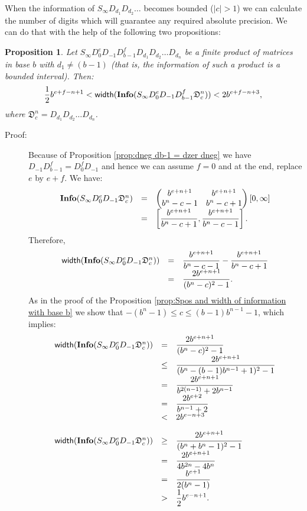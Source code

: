 \documentclass[11pt,a4paper]{article}
\newtheorem{prop}[tm]{Proposition}
\newenvironment{proof}
	{ \begin{description} \item[Proof:] \footnotesize }
	{ \end{description} }
\begin{document}
When the information of $S_\infty D_{d_1} D_{d_2} \ldots$ becomes bounded
	($|c|>1$) we can calculate the number of digits which will guarantee
	any required absolute precision. We can do that with the help of the
	following two propositions:
	\begin{prop} \label{prop:Sinf and width of information with base b 1}
		Let $S_\infty D_0^e D_{-1} D_{b-1}^f D_{d_1} D_{d_2} \ldots D_{d_n}$
		be a finite product of matrices in base $b$ with $d_1 \ne (b-1)$
		(that is, the information of such a product is a bounded interval). Then:
		\[ \frac{1}{2} b^{e+f-n+1} < {\sf width} ( {\bf Info} ( S_\infty
			D_0^e D_{-1} D_{b-1}^f \mathfrak{D}_c^n ) ) < 2b^{e+f-n+3}, \]
		where $\mathfrak{D}_c^n = D_{d_1} D_{d_2} \ldots D_{d_n}$.
	\end{prop}
	\begin{proof}
		Because of Proposition \ref{prop:dneg db-1 = dzer dneg} we have
		$D_{-1} D_{b-1}^f = D_0^f D_{-1}$ and hence we can assume $f=0$
		and at the end, replace $e$ by $e+f$. We have:
		\[ \begin{array}{rcl}
			{\bf Info} (S_\infty D_0^e D_{-1} \mathfrak{D}_c^n) &=&
				\begin{pmatrix} b^{e+n+1} & b^{e+n+1} \\ b^n-c-1 & b^n-c+1
				\end{pmatrix} [0,\infty] \\
			&=& \displaystyle{ \left[ \frac{b^{e+n+1}}{b^n-c+1},
				\frac{b^{e+n+1}}{b^n-c-1} \right]. }
		\end{array} \]
		Therefore,
		\[ \begin{array}{rcl}
			{\sf width} ( {\bf Info} ( S_\infty D_0^e D_{-1}
				\mathfrak{D}_c^n ) ) &=& \displaystyle{ \frac{b^{e+n+1}}{b^n-c-1}
				- \frac{b^{e+n+1}}{b^n-c+1} } \\
			&=& \displaystyle{ \frac{2b^{e+n+1}}{(b^n-c)^2-1}. }
		\end{array} \]
		As in the proof of the Proposition \ref{prop:Spos and width of
		information with base b} we show that $-(b^n-1) \le c \le
		(b-1)b^{n-1}-1$, which implies:
		\[ \begin{array}{rcl}
			{\sf width} ( {\bf Info} ( S_\infty D_0^e D_{-1}
				\mathfrak{D}_c^n ) ) &=& \displaystyle{
				\frac{2b^{e+n+1}}{(b^n-c)^2-1} } \\
			&\le& \displaystyle{ \frac{2b^{e+n+1}}{(b^n-(b-1)b^{n-1}+1)^2 - 1} } \\
			&=& \displaystyle{ \frac{2b^{e+n+1}}{b^{2(n-1)}+2b^{n-1}}  } \\
			&=& \displaystyle{ \frac{2b^{e+2}}{b^{n-1}+2}  } \\
			&<& 2b^{e-n+3} \vspace{1em} \\
			{\sf width} ( {\bf Info} ( S_\infty D_0^e D_{-1}
				\mathfrak{D}_c^n ) ) &\ge& \displaystyle{
				\frac{2b^{e+n+1}}{(b^n+b^n-1)^2-1}  } \\
			&=& \displaystyle{ \frac{2b^{e+n+1}}{4b^{2n}-4b^n} } \\
			&=& \displaystyle{ \frac{b^{e+1}}{2(b^n-1)}  } \\
			&>& \displaystyle{ \frac{1}{2} b^{e-n+1}. }
		\end{array} \]
	\end{proof}
\end{document}
